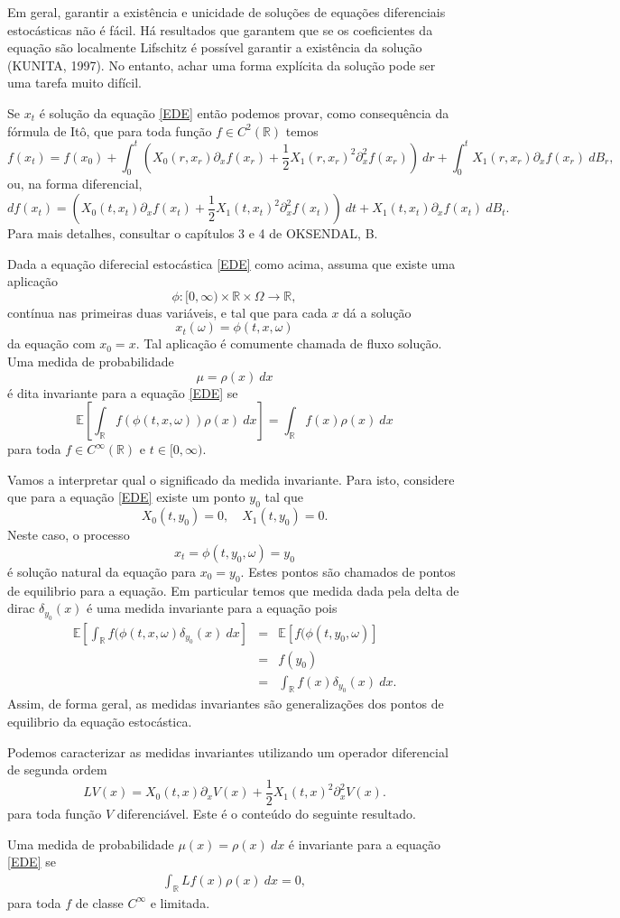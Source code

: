\documentclass[12pt]{article}
\newcommand{\me}{\mathbb{E}}
\newcommand{\mr }{ \mathbb{R}}
\begin{document}
Em geral, garantir a existência e unicidade de soluções de equações diferenciais estocásticas não é fácil. Há resultados que garantem que se os coeficientes da equação são localmente Lifschitz é possível garantir a existência da solução (KUNITA, 1997). No entanto, achar uma forma explícita da solução pode ser uma tarefa muito difícil. 

Se $x_t$ é solução da equação \ref{EDE} então podemos provar, como consequência da fórmula de Itô, que para toda função $f\in C^2(\mr)$ temos  
\[
f(x_t)=f(x_0)+\int_0^t\left(X_0(r,x_r)\partial_xf(x_r)+\frac{1}{2}X_1(r,x_r)^2\partial_x^2f(x_r)\right)~dr+\int_0^tX_1(r,x_r)\partial_xf(x_r)~dB_r,
\]
ou, na forma diferencial,
\[
df(x_t)=\left(X_0(t,x_t)\partial_xf(x_t)+\frac{1}{2}X_1(t,x_t)^2\partial_x^2f(x_t)\right)~dt+X_1(t,x_t)\partial_xf(x_t)~dB_t.
\]
Para mais detalhes, consultar o capítulos 3 e 4 de OKSENDAL, B. 


Dada a equação diferecial estocástica \ref{EDE} como acima, assuma que existe uma aplicação \[\phi:[0,\infty)\times \mr\times \Omega\rightarrow \mr,\] contínua nas primeiras duas variáveis, e tal que para cada $x$ dá a solução \[x_t(\omega)=\phi(t,x,\omega)\] da equação com $x_0=x$. Tal aplicação é comumente chamada de fluxo solução.  Uma medida de probabilidade \[\mu=\rho(x)~dx\] é dita invariante  para a equação \ref{EDE} se 
\[
\me\left[ \int_{\mathbb{R}}f(\phi(t,x,\omega))\rho(x)~dx\right]=\int_{\mathbb{R}}f(x)\rho(x)~dx
\]
para toda $f\in C^\infty(\mathbb{R})$ e $t\in[0,\infty)$.

Vamos a interpretar qual o significado da medida invariante. Para isto, considere que para a equação \ref{EDE}  existe um ponto $y_0$ tal que 
\[
X_0(t,y_0)=0,\quad X_1(t,y_0)=0.
\]
Neste caso, o processo \[x_t=\phi(t,y_0,\omega)=y_0\] é solução natural da equação para $x_0=y_0$. Estes pontos são chamados de pontos de equilibrio para a equação. Em particular temos que medida dada pela delta de dirac $\delta_{y_0}(x)$ é uma medida invariante para a equação pois 
\begin{eqnarray*}
\me\left[\int_{\mathbb{R}}f(\phi(t,x,\omega)\delta_{y_0}(x)~dx\right]&=&\me\left[f(\phi(t,y_0,\omega)\right]\\
&=&f(y_0)\\
&=&\int_{\mathbb{R}}f(x)\delta_{y_0}(x)~dx.
\end{eqnarray*}
Assim, de forma geral, as medidas invariantes são generalizações dos pontos de equilibrio da equação estocástica. 

Podemos caracterizar as medidas invariantes utilizando um operador diferencial de segunda ordem 
\[
LV(x)= X_0(t,x)\partial_xV(x)+\frac{1}{2}X_1(t,x)^2\partial_x^2V(x).
\]
para toda função $V$ diferenciável. Este é o conteúdo do seguinte resultado.
\begin{lema} Uma
medida de probabilidade  $\mu(x)=\rho(x)~dx$ é invariante para a equação \ref{EDE} se 
\begin{eqnarray}\label{eqmedidainvariante}
\int_{\mathbb{R}}Lf(x)\rho(x)~dx=0,
\end{eqnarray} 
para toda $f$ de classe $C^\infty$ e limitada. 
\end{lema}
\end{document}
